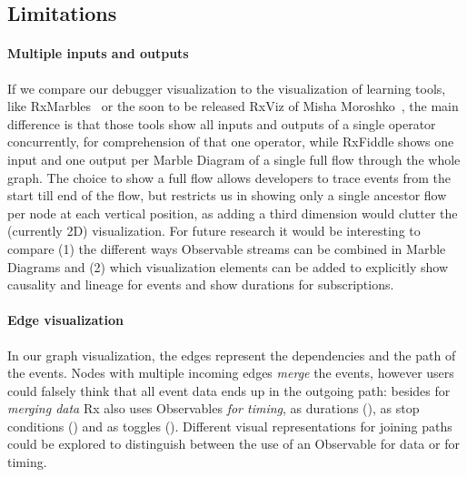 \subsection{Limitations}

\paragraph{Multiple inputs and outputs}
If we compare our debugger visualization to the visualization of learning tools, like RxMarbles~\cite{rxmarbles} or the soon to be released RxViz of Misha Moroshko~\cite{rxviz}, the main difference is that those tools show all inputs and outputs of a single operator concurrently, for comprehension of that one operator, while RxFiddle shows one input and one output per Marble Diagram of a single full flow through the whole graph. The choice to show a full flow allows developers to trace events from the start till end of the flow, but restricts us in showing only a single ancestor flow per node at each vertical position, as adding a third dimension would clutter the (currently 2D) visualization. For future research it would be interesting to compare (1) the different ways Observable streams can be combined in Marble Diagrams and (2) which visualization elements can be added to explicitly show causality and lineage for events and show durations for subscriptions.

\paragraph{Edge visualization}
In our graph visualization, the edges represent the dependencies and the path of the events. Nodes with multiple incoming edges \emph{merge} the events, however users could falsely think that all event data ends up in the outgoing path: besides for \textit{merging data} Rx also uses Observables \textit{for timing}, as durations (), as stop conditions () and as toggles (). Different visual representations for joining paths could be explored to distinguish between the use of an Observable for data or for timing.

